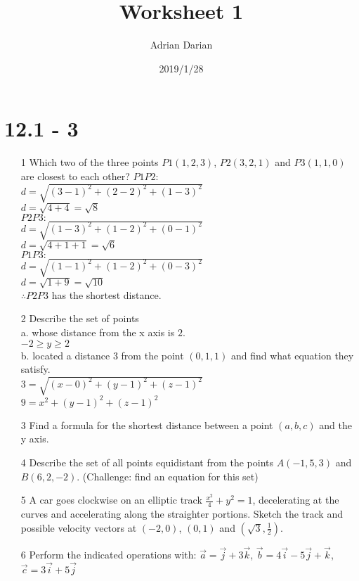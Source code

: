\documentclass[a4paper]{article}
\title{Worksheet 1}
\author{Adrian Darian}
\date{2019/1/28}
\newcommand\tab[1][0.5cm]{\hspace*{#1}}
\begin{document}
 
 \maketitle

 \section*{12.1 - 3}
 \begin{itemize}
 \item[1] Which two of the three points $P1(1,2,3)$, $P2(3,2,1)$ and $P3(1,1,0)$ are closest to each other?
 \tab $P1P2:$ \\
 \tab $d = \sqrt{(3 - 1)^{2} + (2 - 2)^{2} + (1 - 3)^{2}}$ \\
 \tab $d = \sqrt{4 + 4} = \sqrt{8}$ \\
 \tab $P2P3:$ \\
 \tab $d = \sqrt{(1 - 3)^{2} + (1 - 2)^{2} + (0 - 1)^{2}}$ \\
 \tab $d = \sqrt{4 + 1 + 1} = \sqrt{6}$ \\
 \tab $P1P3:$ \\
 \tab $d = \sqrt{(1 - 1)^{2} + (1 - 2)^{2} + (0 - 3)^{2}}$ \\
 \tab $d = \sqrt{1 + 9} = \sqrt{10}$ \\
 \tab $\therefore P2P3$ has the shortest distance.
 \item[2] Describe the set of points \\
  a. whose distance from the x axis is $2$. \\
  \tab $-2 \geq y \geq 2$ \\ 
  b. located a distance $3$ from the point $(0,1,1)$ and find what equation they satisfy. \\
  \tab $3 = \sqrt{(x - 0)^{2} + (y - 1)^{2} + (z - 1)^{2}}$ \\
  \tab $9 = x^{2} + (y - 1)^{2} + (z - 1)^{2}$ 
 \item[3] Find a formula for the shortest distance between a point $(a, b, c)$ and the y axis.
 \item[4] Describe the set of all points equidistant from the points $A(−1,5,3)$ and $B(6,2,−2)$. (Challenge: find an equation for this set)
 \item[5] A car goes clockwise on an elliptic track $\frac{x^2}{4} + y^{2} = 1$, decelerating at the curves and accelerating along the straighter portions. Sketch the track and possible velocity vectors at $(−2,0)$, $(0,1)$ and $(\sqrt{3}, \frac{1}{2})$.
 \item[6] Perform the indicated operations with: $\overrightarrow{a}=\overrightarrow{j} + 3\overrightarrow{k}$, $\overrightarrow{b} = 4\overrightarrow{i} − 5\overrightarrow{j} + \overrightarrow{k}$, $\overrightarrow{c} = 3\overrightarrow{i} + 5\overrightarrow{j}$ \\

\end{itemize}
\end{document}
